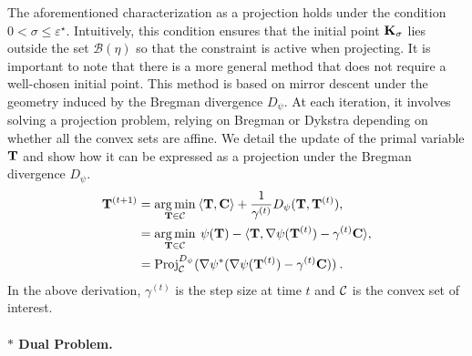 \begin{remark}\label{rem:mirror_descent}
    The aforementioned characterization as a projection holds under the condition $0 < \sigma \leq \varepsilon^\star$. Intuitively, this condition ensures that the initial point ${\mathbf{K}}_\sigma$ lies outside the set $\mathcal{B}(\eta)$ so that the constraint is active when projecting.
    It is important to note that there is a more general method that does not require a well-chosen initial point. This method is based on mirror descent under the geometry induced by the Bregman divergence $D_\psi$. At each iteration, it involves solving a projection problem, relying on Bregman or Dykstra depending on whether all the convex sets are affine. We detail the update of the primal variable ${\mathbf{T}}$ and show how it can be expressed as a projection under the Bregman divergence $D_\psi$.
    \begin{align}
    {\mathbf{T}}^{(t+1)} &= \operatorname*{arg\,min}_{{\mathbf{T}} \in {\mathcal{C}}} \: \langle {\mathbf{T}}, {\mathbf{C}} \rangle + \frac{1}{\gamma^{(t)}} D_{\psi}({\mathbf{T}}, {\mathbf{T}}^{(t)}), \\
    &= \operatorname*{arg\,min}_{{\mathbf{T}} \in {\mathcal{C}}} \: \psi({\mathbf{T}}) - \langle {\mathbf{T}}, \nabla \psi({\mathbf{T}}^{(t)}) - \gamma^{(t)} {\mathbf{C}} \rangle, \\
    &= \operatorname{Proj}^{D_\psi}_{{\mathcal{C}}}(\nabla \psi^*(\nabla \psi({\mathbf{T}}^{(t)}) - \gamma^{(t)} {\mathbf{C}})) \:.
    \end{align}
    In the above derivation, $\gamma^{(t)}$ is the step size at time $t$ and ${\mathcal{C}}$ is the convex set of interest.
\end{remark}    


\paragraph{$\ast$ Dual Problem.}

